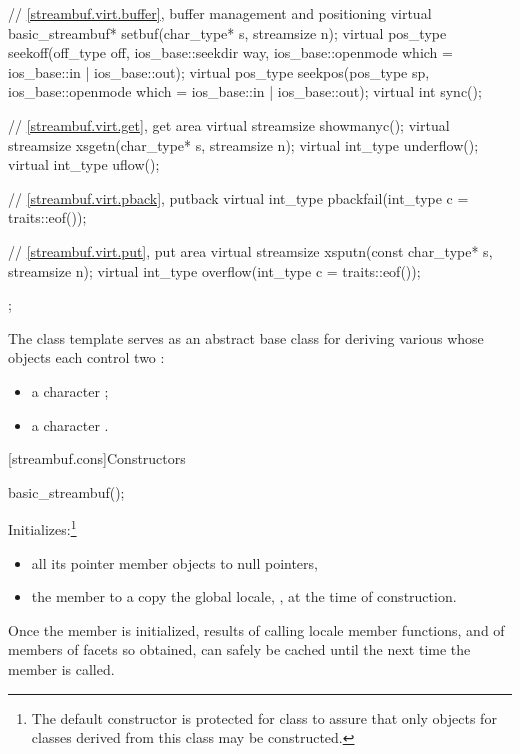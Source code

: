 \begin{codeblock}
{{    // \ref{streambuf.virt.buffer}, buffer management and positioning
    virtual basic_streambuf* setbuf(char_type* s, streamsize n);
    virtual pos_type seekoff(off_type off, ios_base::seekdir way,
                             ios_base::openmode which
                               = ios_base::in | ios_base::out);
    virtual pos_type seekpos(pos_type sp,
                             ios_base::openmode which
                               = ios_base::in | ios_base::out);
    virtual int      sync();

    // \ref{streambuf.virt.get}, get area
    virtual streamsize showmanyc();
    virtual streamsize xsgetn(char_type* s, streamsize n);
    virtual int_type   underflow();
    virtual int_type   uflow();

    // \ref{streambuf.virt.pback}, putback
    virtual int_type   pbackfail(int_type c = traits::eof());

    // \ref{streambuf.virt.put}, put area
    virtual streamsize xsputn(const char_type* s, streamsize n);
    virtual int_type   overflow(int_type c = traits::eof());
  };
}
\end{codeblock}

\pnum
The class template
serves as an abstract base class for deriving various
whose objects each control two
:
\begin{itemize}
\item
a character
;
\item
a character
.
\end{itemize}

[streambuf.cons]{Constructors}

%
\begin{itemdecl}
basic_streambuf();
\end{itemdecl}

\begin{itemdescr}
\pnum
\effects
Initializes:\footnote{The default constructor is protected for class
to assure that only objects for classes
derived from this class may be constructed.}
\begin{itemize}
\item
all its pointer member objects to null pointers,
\item
the
member to a copy the global locale,
,
at the time of construction.
\end{itemize}

\pnum
\remarks
Once the
member is initialized, results of calling locale member functions,
and of members of facets so obtained, can safely be cached until the
next time the member
is called.
\end{itemdescr}

